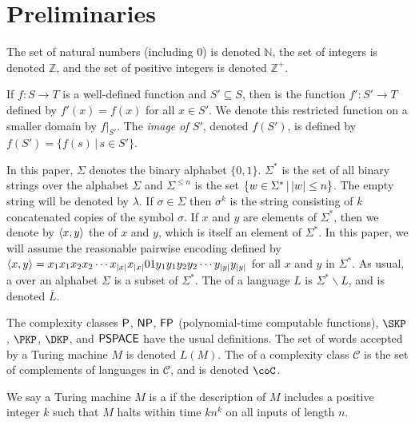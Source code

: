 \section{Preliminaries}
\label{sec:preliminaries}

The set of natural numbers (including $0$) is denoted $\mathbb{N}$, the set of integers is denoted $\mathbb{Z}$, and the set of positive integers is denoted $\mathbb{Z}^+$.

If $f\colon S\to T$ is a well-defined function and $S'\subseteq S$, then  is the function $f'\colon S'\to T$ defined by $f'(x)=f(x)$ for all $x\in S'$.
We denote this restricted function on a smaller domain by $f|_{S'}$.
The \emph{image of $S'$}, denoted $f(S')$, is defined by $f(S') = \{f(s) \, | \, s \in S'\}$.

In this paper, $\Sigma$ denotes the binary alphabet $\{0, 1\}$.
$\Sigma^*$ is the set of all binary strings over the alphabet $\Sigma$ and $\Sigma^{\leq n}$ is the set $\lb w\in\Sigma^* \, \middle| \, |w|\leq n \rb$.
The empty string will be denoted by $\lambda$.
If $\sigma\in\Sigma$ then $\sigma^k$ is the string consisting of $k$ concatenated copies of the symbol $\sigma$.
If $x$ and $y$ are elements of $\Sigma^*$, then we denote by $\pair{x}{y}$ the  of $x$ and $y$, which is itself an element of $\Sigma^*$.
In this paper, we will assume the reasonable pairwise encoding defined by $\pair{x}{y}=x_1x_1x_2x_2\cdots x_{|x|}x_{|x|}01y_1y_1y_2y_2\cdots y_{|y|}y_{|y|}$ for all $x$ and $y$ in $\Sigma^*$.
As usual, a  over an alphabet $\Sigma$ is a subset of $\Sigma^*$.
The  of a language $L$ is $\Sigma^*\backslash L$, and is denoted $\overline{L}$.

The complexity classes $\P$, $\NP$, $\FP$ (polynomial-time computable functions), $\SKP$, $\PKP$, $\DKP$, and $\PSPACE$ have the usual definitions.
The set of words accepted by a Turing machine $M$ is denoted $L(M)$.
The  of a complexity class $\mathcal{C}$ is the set of complements of languages in $\mathcal{C}$, and is denoted $\coC$.

We say a Turing machine $M$ is a  if the description of $M$ includes a positive integer $k$ such that $M$ halts within time $kn^k$ on all inputs of length $n$.

